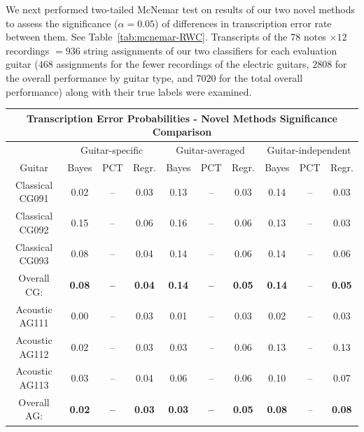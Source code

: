 \documentclass[convention,peer-reviewed]{aesconf}
\begin{document}
We next performed two-tailed McNemar test on results of our two novel methods to assess the significance ($\alpha = 0.05$) of differences in transcription error rate between them. See Table~\ref{tab:mcnemar-RWC}. Transcripts of the $78$ notes $\times 12$ recordings $= 936$ string assignments of our two classifiers for each evaluation guitar ($468$ assignments for the fewer recordings of the electric guitars, $2808$ for the overall performance by guitar type, and $7020$ for the total overall performance) along with their true labels were examined.

\begin{table}[!htbp]
\begin{center}
\begin{tabular} {||c||c|c|c||c|c|c||c|c|c||}
\hline
\multicolumn{10}{||c||}{\bf{Transcription Error Probabilities - Novel Methods Significance Comparison}} \\
\hline
 & \multicolumn{3}{|c||}{Guitar-specific} & \multicolumn{3}{|c||}{Guitar-averaged}& \multicolumn{3}{|c||}{Guitar-independent}\\
\hline
Guitar & Bayes & PCT & Regr. & Bayes & PCT & Regr. & Bayes & PCT & Regr.\\
\hline
\hline
Classical CG091 & 0.02 & -- & 0.03 & 0.13 & -- & \cellcolor[gray]{0.8}0.03 & 0.14 & -- & \cellcolor[gray]{0.8}0.03 \\
\hline
Classical CG092 & 0.15 & -- & \cellcolor[gray]{0.8}0.06 & 0.16 & -- & \cellcolor[gray]{0.8}0.06 & 0.13 & -- & \cellcolor[gray]{0.8}0.03 \\
\hline
Classical CG093 & 0.08 & -- & \cellcolor[gray]{0.8}0.04 & 0.14 & -- & \cellcolor[gray]{0.8}0.06 & 0.14 & -- & \cellcolor[gray]{0.8}0.06 \\
\hline
Overall CG: & \bf{0.08} & \bf{--}  & \cellcolor[gray]{0.8}\bf{0.04} & \bf{0.14} & \bf{--} & \cellcolor[gray]{0.8}\bf{0.05} & \bf{0.14} & -- & \cellcolor[gray]{0.8}\bf{0.05}\\
\hline
\hline
Acoustic AG111 & \cellcolor[gray]{0.8}0.00 & -- & 0.03 & \cellcolor[gray]{0.8}0.01 & -- & 0.03 & \cellcolor[gray]{0.8}0.02 & -- & 0.03 \\
\hline
Acoustic AG112 & 0.02 & -- & 0.03 & \cellcolor[gray]{0.8}0.03 & -- & 0.06 & 0.13 & -- & 0.13 \\
\hline
Acoustic AG113  & 0.03 & -- & 0.04 & 0.06 & -- & 0.06 & 0.10 & -- & \cellcolor[gray]{0.8}0.07\\
\hline
Overall AG: & \cellcolor[gray]{0.8}\bf{0.02} & \bf{--} & \bf{0.03} & \cellcolor[gray]{0.8}\bf{0.03} & \bf{--} & \bf{0.05} & \bf{0.08} & -- & \bf{0.08}\\

\end{tabular}
\end{center}
\end{table}
\end{document}
